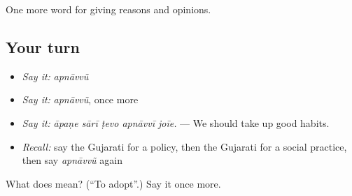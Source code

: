 \begin{grammarlens}[title={What you've built}]
One more word for giving reasons and opinions.
\end{grammarlens}

\subsection*{Your turn}
\begin{itemize}
\raggedright
  \item \emph{Say it:} \emph{apnāvvũ}
  \item \emph{Say it:} \emph{apnāvvũ}, once more
  \item \emph{Say it:} \emph{āpaṇe sārī ṭevo apnāvvī joīe.} — We should take up good habits.
  \item \emph{Recall:} say the Gujarati for a policy, then the Gujarati for a social practice, then say \emph{apnāvvũ} again
\end{itemize}

\begin{tcolorbox}[breakable,colback=teal!4,colframe=teal!35!black,title={Before you move on}]
What does  mean? (\textquotedblleft{}To adopt\textquotedblright{}.) Say it once more.
\end{tcolorbox}
